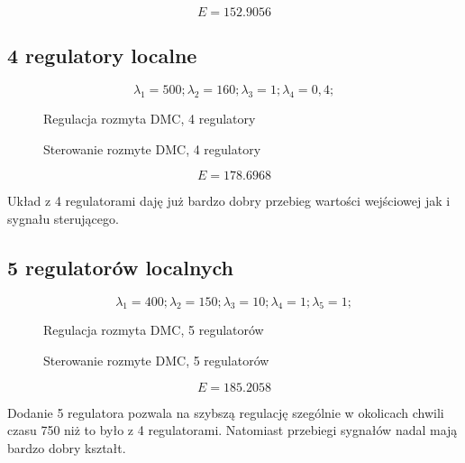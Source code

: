 \begin{equation}
    E = \num{152,9056}
\end{equation}

\subsection{4 regulatory localne}

\begin{equation}
{\lambda}_1 = 500; {\lambda}_2 = 160; {\lambda}_3 = 1; {\lambda}_4 = 0,4;
\end{equation}

\begin{figure}[H]
\centering

\caption{Regulacja rozmyta DMC, 4 regulatory}
\end{figure}

\begin{figure}[H]
\centering

\caption{Sterowanie rozmyte DMC, 4 regulatory}
\end{figure}

\begin{equation}
    E = \num{178,6968}
\end{equation}

Układ z 4 regulatorami daję już bardzo dobry przebieg wartości wejściowej jak i sygnału sterującego.

\subsection{5 regulatorów localnych}

\begin{equation}
{\lambda}_1 = 400; {\lambda}_2 = 150; {\lambda}_3 = 10; {\lambda}_4 = 1; {\lambda}_5 = 1;
\end{equation}

\begin{figure}[H]
\centering

\caption{Regulacja rozmyta DMC, 5 regulatorów}
\end{figure}

\begin{figure}[H]
\centering

\caption{Sterowanie rozmyte DMC, 5 regulatorów}
\end{figure}

\begin{equation}
    E = \num{185,2058}
\end{equation}

Dodanie 5 regulatora pozwala na szybszą regulację szególnie w okolicach chwili czasu 750 niż to było z 4 regulatorami. Natomiast przebiegi sygnałów nadal mają bardzo dobry kształt.